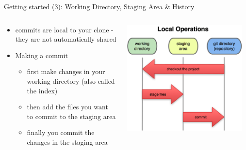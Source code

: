 \begin{frame}{Getting started (3): Working Directory, Staging Area \& History}
  \begin{columns}[onlytextwidth]
    \begin{column}{0.5\textwidth}
      \begin{itemize}
        \item commits are local to your clone - they are not automatically shared
        \item Making a commit
        \begin{itemize}
          \item first make changes in your working directory (also called the index)
          \item then add the files you want to commit to the staging area
          \item finally you commit the changes in the staging area
        \end{itemize}
      \end{itemize}
    \end{column}
    \begin{column}{0.5\textwidth}
      \includegraphics[width=0.95\textwidth]{imgs/git_local}
    \end{column}
  \end{columns}
\end{frame}

